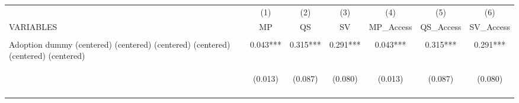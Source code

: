 \begin{center}
\begin{tabular}{lcccccc} \hline
 & (1) & (2) & (3) & (4) & (5) & (6) \\
VARIABLES & MP & QS & SV & MP\_Access & QS\_Access & SV\_Access \\ \hline
\vspace{4pt} & \begin{footnotesize}\end{footnotesize} & \begin{footnotesize}\end{footnotesize} & \begin{footnotesize}\end{footnotesize} & \begin{footnotesize}\end{footnotesize} & \begin{footnotesize}\end{footnotesize} & \begin{footnotesize}\end{footnotesize} \\
Adoption dummy (centered) (centered) (centered) (centered) (centered) (centered) & 0.043*** & 0.315*** & 0.291*** & 0.043*** & 0.315*** & 0.291*** \\
 & \begin{footnotesize}(0.013)\end{footnotesize} & \begin{footnotesize}(0.087)\end{footnotesize} & \begin{footnotesize}(0.080)\end{footnotesize} & \begin{footnotesize}(0.013)\end{footnotesize} & \begin{footnotesize}(0.087)\end{footnotesize} & \begin{footnotesize}(0.080)\end{footnotesize} \\
\vspace{4pt} & \begin{footnotesize}[0.001]\end{footnotesize} & \begin{footnotesize}[0.000]\end{footnotesize} & \begin{footnotesize}[0.000]\end{footnotesize} & \begin{footnotesize}[0.001]\end{footnotesize} & \begin{footnotesize}[0.000]\end{footnotesize} & \begin{footnotesize}[0.000]\end{footnotesize} \\

\end{tabular}
\end{center}
